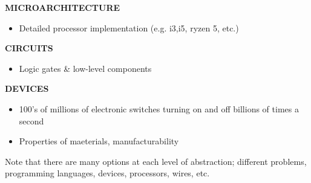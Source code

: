 \documentclass[letterpaper]{report}
\begin{document}
\textbf{MICROARCHITECTURE}
\begin{itemize}
    \item Detailed processor implementation (e.g. i3,i5, ryzen 5, etc.)
\end{itemize}
\textbf{CIRCUITS}
\begin{itemize}
    \item Logic gates \& low-level components
\end{itemize}
\textbf{DEVICES}
\begin{itemize}
    \item 100's of millions of electronic switches turning on and off billions of times a second
    \item Properties of maeterials, manufacturability
\end{itemize}
Note that there are many options at each level of abstraction; different problems, programming languages, devices, processors, wires, etc. 
\end{document}
